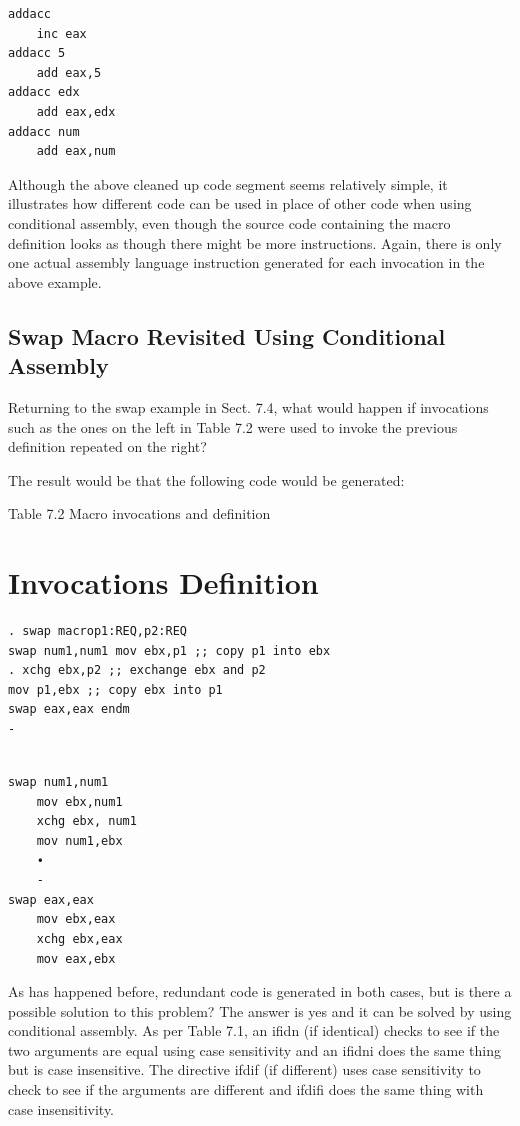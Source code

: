 \documentclass[10pt]{article}
\begin{document}
\begin{verbatim}
addacc
    inc eax
addacc 5
    add eax,5
addacc edx
    add eax,edx
addacc num
    add eax,num
\end{verbatim}

Although the above cleaned up code segment seems relatively simple, it illustrates how different code can be used in place of other code when using conditional assembly, even though the source code containing the macro definition looks as though there might be more instructions. Again, there is only one actual assembly language instruction generated for each invocation in the above example.

\subsection*{Swap Macro Revisited Using Conditional Assembly}
Returning to the swap example in Sect. 7.4, what would happen if invocations such as the ones on the left in Table 7.2 were used to invoke the previous definition repeated on the right?

The result would be that the following code would be generated:

Table 7.2 Macro invocations and definition

\section*{Invocations Definition}
\begin{verbatim}
. swap macrop1:REQ,p2:REQ
swap num1,num1 mov ebx,p1 ;; copy p1 into ebx
. xchg ebx,p2 ;; exchange ebx and p2
mov p1,ebx ;; copy ebx into p1
swap eax,eax endm
-
\end{verbatim}

\begin{verbatim}
      
swap num1,num1
    mov ebx,num1
    xchg ebx, num1
    mov num1,ebx
    •
    -
swap eax,eax
    mov ebx,eax
    xchg ebx,eax
    mov eax,ebx
\end{verbatim}

As has happened before, redundant code is generated in both cases, but is there a possible solution to this problem? The answer is yes and it can be solved by using conditional assembly. As per Table 7.1, an ifidn (if identical) checks to see if the two arguments are equal using case sensitivity and an ifidni does the same thing but is case insensitive. The directive ifdif (if different) uses case sensitivity to check to see if the arguments are different and ifdifi does the same thing with case insensitivity.
\end{document}
